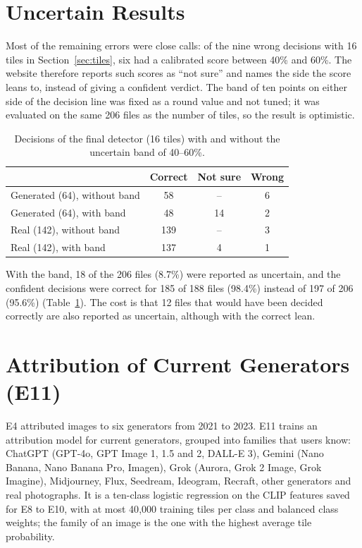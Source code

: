 \documentclass{mnnit}
\begin{document}
\section{Uncertain Results}
\label{sec:unsure}
Most of the remaining errors were close calls: of the nine wrong
decisions with 16 tiles in Section~\ref{sec:tiles}, six had a calibrated
score between 40\% and 60\%. The website therefore reports such scores
as ``not sure'' and names the side the score leans to, instead of giving
a confident verdict. The band of ten points on either side of the
decision line was fixed as a round value and not tuned; it was evaluated
on the same 206 files as the number of tiles, so the result is
optimistic.

\begin{table}[htbp]
\centering
\caption{Decisions of the final detector (16 tiles) with and without the uncertain band of 40--60\%.}
\label{tab:unsure}
\small
\begin{tabular}{lccc}
\toprule
 & \textbf{Correct} & \textbf{Not sure} & \textbf{Wrong}\\
\midrule
Generated (64), without band & 58 & -- & 6\\
Generated (64), with band & 48 & 14 & 2\\
Real (142), without band & 139 & -- & 3\\
Real (142), with band & 137 & 4 & 1\\
\bottomrule
\end{tabular}
\end{table}

With the band, 18 of the 206 files (8.7\%) were reported as uncertain,
and the confident decisions were correct for 185 of 188 files (98.4\%)
instead of 197 of 206 (95.6\%) (Table~\ref{tab:unsure}). The cost is that
12 files that would have been decided correctly are also reported as
uncertain, although with the correct lean.

\section{Attribution of Current Generators (E11)}
\label{sec:e11}
E4 attributed images to six generators from 2021 to 2023. E11 trains an
attribution model for current generators, grouped into families that
users know: ChatGPT (GPT-4o, GPT Image 1, 1.5 and 2, DALL-E 3), Gemini
(Nano Banana, Nano Banana Pro, Imagen), Grok (Aurora, Grok 2 Image, Grok
Imagine), Midjourney, Flux, Seedream, Ideogram, Recraft, other generators
and real photographs. It is a ten-class logistic regression on the CLIP
features saved for E8 to E10, with at most 40{,}000 training tiles per
class and balanced class weights; the family of an image is the one with
the highest average tile probability.
\end{document}
